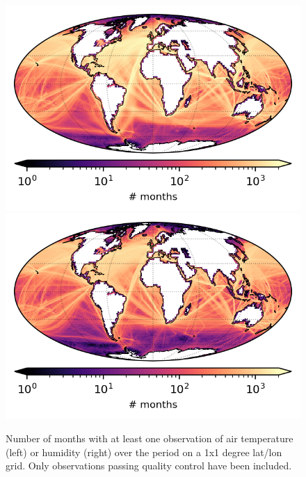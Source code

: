 \begin{figure}[h]
    \centering
    \includegraphics{resources/observations-at-months-map-optimal.png}
    \includegraphics{resources/observations-dpt-months-map-optimal.png}
    \caption{Number of months with at least one observation of air temperature (left) or humidity (right) over the period \datatimerange{} on a 1x1 degree lat/lon grid. Only observations passing quality control have been included.\\}
    \label{fig:at-nmonths-map}
\end{figure}

\FloatBarrier
